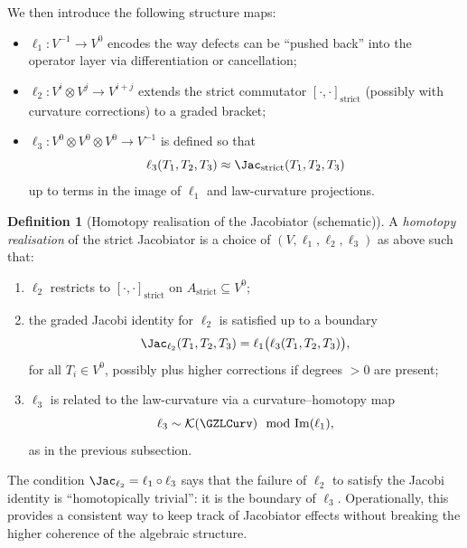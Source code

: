 \documentclass[11pt]{book}
\theoremstyle{plain}
\theoremstyle{definition}
\newtheorem{definition}[theorem]{Definition} \theoremstyle{remark}
\begin{document}
We then introduce the following structure maps:
\begin{itemize}
  \item $\ell_1:V^{-1}\to V^0$ encodes the way defects can be “pushed
        back” into the operator layer via differentiation or
        cancellation;
  \item $\ell_2:V^i\otimes V^j\to V^{i+j}$ extends the strict
        commutator $[\cdot,\cdot]_{\mathrm{strict}}$ (possibly with
        curvature corrections) to a graded bracket;
  \item $\ell_3:V^0\otimes V^0\otimes V^0\to V^{-1}$ is defined so
        that
        \[
           \ell_3(T_1,T_2,T_3)
           \approx
           \Jac_{\mathrm{strict}}(T_1,T_2,T_3)
        \]
        up to terms in the image of $\ell_1$ and law-curvature
        projections.
\end{itemize}

\begin{definition}[Homotopy realisation of the Jacobiator (schematic)]
A \emph{homotopy realisation} of the strict Jacobiator is a choice
  of $(V,\ell_1,\ell_2,\ell_3)$ as above such that:
  \begin{enumerate}[label=\roman*)]
    \item $\ell_2$ restricts to $[\cdot,\cdot]_{\mathrm{strict}}$ on
          $A_{\mathrm{strict}}\subseteq V^0$;
    \item the graded Jacobi identity for $\ell_2$ is satisfied up to
          a boundary
          \[
             \Jac_{\ell_2}(T_1,T_2,T_3)
             =
             \ell_1\bigl(\ell_3(T_1,T_2,T_3)\bigr),
          \]
          for all $T_i\in V^0$, possibly plus higher corrections if
          degrees $>0$ are present;
    \item $\ell_3$ is related to the law-curvature via a
          curvature–homotopy map
          \[
             \ell_3
             \sim
             \mathcal{K}(\GZLCurv)
             \mod \mathrm{Im}(\ell_1),
          \]
          as in the previous subsection.
  \end{enumerate}
\end{definition}

The condition $\Jac_{\ell_2}=\ell_1\circ\ell_3$ says that the failure
of $\ell_2$ to satisfy the Jacobi identity is “homotopically
trivial”: it is the boundary of $\ell_3$. Operationally, this provides
a consistent way to keep track of Jacobiator effects without breaking
the higher coherence of the algebraic structure.
\end{document}
